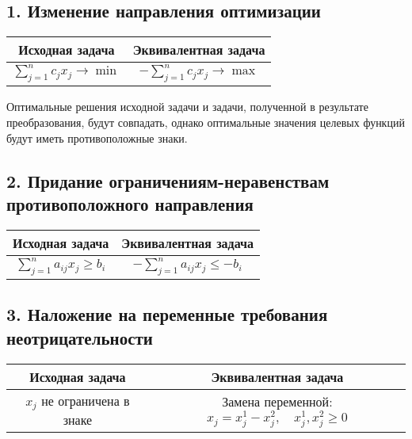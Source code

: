 \documentclass[17pt]{extarticle}
\begin{document}
\subsection{1. Изменение направления оптимизации}

\begin{center}
    \begin{tabular}{|c|c|}
        \hline
        \textbf{Исходная задача}                   & \textbf{Эквивалентная задача}               \\
        \hline
        \( \sum\limits_{j=1}^n c_j x_j \to \min \) & \( -\sum\limits_{j=1}^n c_j x_j \to \max \) \\
        \hline
    \end{tabular}
\end{center}

Оптимальные решения исходной задачи и задачи, полученной в результате преобразования, будут совпадать, однако оптимальные значения целевых функций будут иметь противоположные знаки.

\subsection{2. Придание ограничениям-неравенствам противоположного направления}

\begin{center}
    \begin{tabular}{|c|c|}
        \hline
        \textbf{Исходная задача}                     & \textbf{Эквивалентная задача}                  \\
        \hline
        \( \sum\limits_{j=1}^n a_{ij} x_j \ge b_i \) & \( -\sum\limits_{j=1}^n a_{ij} x_j \le -b_i \) \\
        \hline
    \end{tabular}
\end{center}

\subsection{3. Наложение на переменные требования неотрицательности}

\begin{center}
    \begin{tabular}{|c|c|}
        \hline
        \textbf{Исходная задача}        & \textbf{Эквивалентная задача}                                          \\
        \hline
        \( x_j \) не ограничена в знаке & Замена переменной: \( x_j = x_j^1 - x_j^2, \quad x_j^1, x_j^2 \ge 0 \) \\
        \hline
    \end{tabular}
\end{center}
\end{document}
